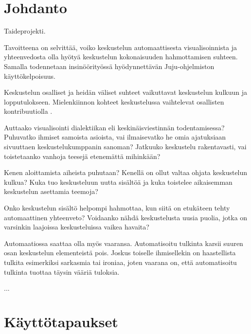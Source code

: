 \documentclass[11pt,a4paper,oneside]{memoir}
\begin{document}



\setcounter{page}{1} %


\chapter{Johdanto}
Taideprojekti.

Tavoitteena on selvittää, voiko keskustelun automaattisesta visualisoinnista ja yhteenvedosta olla hyötyä keskustelun kokonaisuuden hahmottamisen suhteen. Samalla todennetaan insinöörityössä hyödynnettävän Juju-ohjelmiston käyttökelpoisuus.

Keskustelun osalliset ja heidän väliset suhteet vaikuttavat keskustelun kulkuun ja lopputulokseen. Mielenkiinnon kohteet keskustelussa vaihtelevat osallisten kontribuutiolla \cite[s. 1]{finding-topics-in-dynamical-text}. 

Auttaako visualisointi dialektiikan eli keskinäisviestinnän todentamisessa? Puhuvatko ihmiset samoista asioista, vai ilmaisevatko he omia ajatuksiaan sivuuttaen keskustelukumppanin sanoman? Jatkuuko keskustelu rakentavasti, vai toistetaanko vanhoja teesejä etenemättä mihinkään?

Kenen aloittamista aiheista puhutaan? Kenellä on ollut valtaa ohjata keskustelun kulkua? Kuka tuo keskusteluun uutta sisältöä ja kuka toistelee aikaisemman keskustelun asettamia teemoja?

Onko keskustelun sisältö helpompi hahmottaa, kun siitä on etukäteen tehty automaattinen yhteenveto? Voidaanko nähdä keskustelusta uusia puolia, jotka on varsinkin laajoissa keskusteluissa vaikea havaita?

Automaatiossa saattaa olla myös vaaransa. Automatisoitu tulkinta karsii suuren osan keskustelun elementeistä pois. Joskus toiselle ihmisellekin on haastellista tulkita esimerkiksi sarkasmia tai ironiaa, joten vaarana on, että automatisoitu tulkinta tuottaa täysin vääriä tuloksia.

...

\chapter{Käyttötapaukset}
\end{document}
